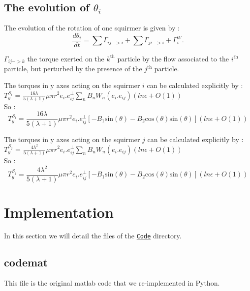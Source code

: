 \documentclass{article}
\begin{document}
\subsection{The evolution of $\theta_i$}
The evolution of the rotation of one squirmer is given by : 
$$
\frac{d \theta_i}{dt} = \sum \Gamma_{ij->i} + \sum \Gamma_{ji->i} +  \Gamma_{i}^W.
$$

$\Gamma_{ij->k}$ the torque exerted on the $k^\mathrm{th}$ particle by the flow associated to the $i^\mathrm{th}$ particle, but perturbed by the presence of the $j^\mathrm{th}$ particle.\\

\vspace{0.5cm}

The torques in y axes acting on the squirmer $i$ can be calculated explicitly by : \\
$T_y^{S_i}$ = $\frac{16 \lambda}{5(\lambda +1)} \mu \pi r^2 e_i.e^{\perp}_{ij}\sum_{n} B_n W_n(e_i.e_{ij}) (ln \epsilon + O(1))$ \cite{Brumley}
\\ So :
\begin{equation*}
    \boxed{T_y^{S_i} = \frac{16 \lambda}{5(\lambda +1)} \mu \pi r^2 e_i.e^{\perp}_{ij}\left[-B_1\mathrm{sin}(\theta) -B_2\mathrm{cos}(\theta)\mathrm{sin}(\theta) \right] (ln \epsilon + O(1))}
\end{equation*}

The torques in y axes acting on the squirmer $j$ can be calculated explicitly by : \\
$T_y^{S_j}$ = $\frac{4 \lambda^2}{5(\lambda +1)} \mu \pi r^2 e_i.e^{\perp}_{ij}\sum_{n} B_n W_n(e_i.e_{ij}) (ln \epsilon + O(1))$ \cite{Brumley}
\\ So :
\begin{equation*}
    \boxed{T_y^{S_j} = \frac{4 \lambda^2}{5(\lambda +1)} \mu \pi r^2 e_i.e^{\perp}_{ij}\left[-B_1\mathrm{sin}(\theta) -B_2\mathrm{cos}(\theta)\mathrm{sin}(\theta) \right] (ln \epsilon + O(1))}
\end{equation*}

\newpage
\section{Implementation}
In this section we will detail the files of the \texttt{\href{https://github.com/master-csmi/2024-m1-nemo/tree/main/Code}{Code}} directory.

\subsection{codemat}
This file is the original matlab code that we re-implemented in Python.
\end{document}
